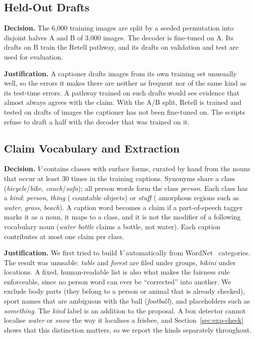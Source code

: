 \subsection{Held-Out Drafts}
\textbf{Decision.} The 6{,}000 training images are split by a seeded permutation into disjoint halves A and B of 3{,}000 images. The decoder is fine-tuned on A. Its drafts on B train the Retell pathway, and its drafts on validation and test are used for evaluation.

\textbf{Justification.} A captioner drafts images from its own training set unusually well, so the errors it makes there are neither as frequent nor of the same kind as its test-time errors. A pathway trained on such drafts would see evidence that almost always agrees with the claim. With the A/B split, Retell is trained and tested on drafts of images the captioner has not been fine-tuned on. The scripts refuse to draft a half with the decoder that was trained on it.

\subsection{Claim Vocabulary and Extraction}
\label{sec:design-claims}
\textbf{Decision.} $V$ contains \NumClasses{} classes with \NumSurface{} surface forms, curated by hand from the nouns that occur at least 30 times in the training captions. Synonyms share a class (\emph{bicycle}/\emph{bike}, \emph{couch}/\emph{sofa}); all person words form the class \emph{person}. Each class has a \emph{kind}: \emph{person}, \emph{thing} (\NumThing{} countable objects) or \emph{stuff} (\NumStuff{} amorphous regions such as \emph{water}, \emph{grass}, \emph{beach}). A caption word becomes a claim if a part-of-speech tagger marks it as a noun, it maps to a class, and it is not the modifier of a following vocabulary noun (\emph{water bottle} claims a bottle, not water). Each caption contributes at most one claim per class.

\textbf{Justification.} We first tried to build $V$ automatically from WordNet~\cite{miller1995wordnet} categories. The result was unusable: \emph{table} and \emph{forest} are filed under groups, \emph{bikini} under locations. A fixed, human-readable list is also what makes the fairness rule enforceable, since no person word can ever be ``corrected'' into another. We exclude body parts (they belong to a person or animal that is already checked), sport names that are ambiguous with the ball (\emph{football}), and placeholders such as \emph{something}. The \emph{kind} label is an addition to the proposal. A box detector cannot localise \emph{water} or \emph{snow} the way it localises a frisbee, and Section~\ref{sec:exp-check} shows that this distinction matters, so we report the kinds separately throughout.

